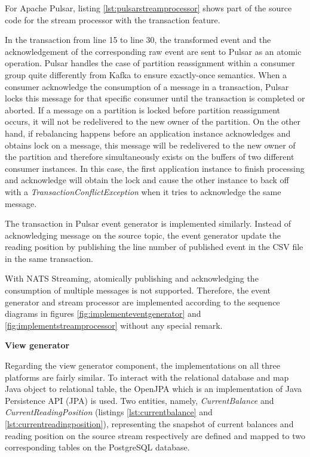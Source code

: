 For Apache Pulsar, listing \ref{lst:pulsarstreamprocessor} shows part of the source code for the stream processor with the transaction feature. 

 

In the transaction from line 15 to line 30, the transformed event and the acknowledgement of the corresponding raw event are sent to Pulsar as an atomic operation. Pulsar handles the case of partition reassignment within a consumer group quite differently from Kafka to ensure exactly-once semantics. When a consumer acknowledge the consumption of a message in a transaction, Pulsar locks this message for that specific consumer \cite{pulsartransaction} until the transaction is completed or aborted. If a message on a partition is locked before partition reassignment occurs, it will not be redelivered to the new owner of the partition. On the other hand, if rebalancing happens before an application instance acknowledges and obtains lock on a message, this message will be redelivered to the new owner of the partition and therefore simultaneously exists on the buffers of two different consumer instances. In this case, the first application instance to finish processing and acknowledge will obtain the lock and cause the other instance to back off with a \emph{TransactionConflictException} when it tries to acknowledge the same message.

The transaction in Pulsar event generator is implemented similarly. Instead of acknowledging message on the source topic, the event generator update the reading position by publishing the line number of published event in the CSV file in the same transaction. 

With NATS Streaming, atomically publishing and acknowledging the consumption of multiple messages is not supported. Therefore, the event generator and stream processor are implemented according to the sequence diagrams in figures \ref{fig:implementeventgenerator} and \ref{fig:implementstreamprocessor} without any special remark.

\textbf{View generator}

Regarding the view generator component, the implementations on all three platforms are fairly similar. To interact with the relational database and map Java object to relational table, the OpenJPA which is an implementation of Java Persistence API (JPA) \cite{jpa} is used. Two entities, namely, \emph{CurrentBalance} and \emph{CurrentReadingPosition} (listings \ref{lst:currentbalance} and \ref{lst:currentreadingposition}), representing the snapshot of current balances and reading position on the source stream respectively are defined and mapped to two corresponding tables on the PostgreSQL database.   


